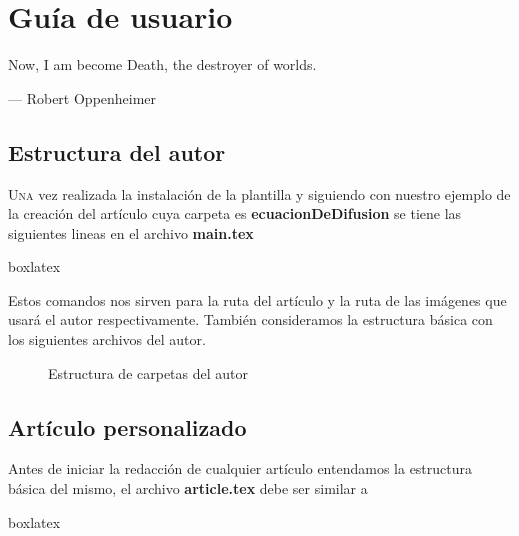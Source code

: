 {
	\justifying
	\chapter{Guía de usuario}\label{cap:guiaDeUsuario}
	\epigraph{Now, I am become Death, the destroyer of worlds.}{--- \textup{Robert Oppenheimer}}
	\section{Estructura del autor}
		\lettrine[lines=2, nindent=0em]{U}{na} vez realizada la instalación de la plantilla 
		y siguiendo con nuestro ejemplo de la creación del artículo  cuya carpeta es \textbf{ecuacionDeDifusion} se tiene las siguientes lineas en el archivo \textbf{main.tex}
		\pap
		\begin{tcblisting}{boxlatex}
			\def\ecuacionDeDifusion{articles/ecuacionDeDifusion}
			\def\ecuacionDeDifusionImages{\ecuacionDeDifusion/images}
		\end{tcblisting}
	  	Estos comandos nos sirven para la ruta del artículo y la ruta de las imágenes que usará el autor respectivamente. También consideramos la estructura básica con los siguientes archivos del autor.
		\begin{figure}[ht]
			\caption{Estructura de carpetas del autor}
			\label{fig:EstructuraDeAutor}
		\end{figure}
	\section{Artículo personalizado}
	Antes de iniciar la redacción de cualquier artículo entendamos la estructura básica del mismo, el archivo \textbf{article.tex} debe ser similar a
	\begin{tcblisting}{boxlatex}
	{\justifying
}
\end{tcblisting}}
